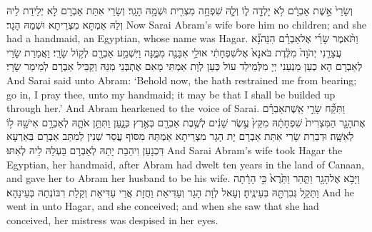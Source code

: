\newperek
\newseder
{}%
{וְשָׂרַי֙ אֵ֣שֶׁת אַבְרָ֔ם לֹ֥א יָלְדָ֖ה ל֑וֹ וְלָ֛הּ שִׁפְחָ֥ה מִצְרִ֖ית וּשְׁמָ֥הּ הָגָֽר׃}
{וְשָׂרַי אִתַּת אַבְרָם לָא יְלֵידַת לֵיהּ וְלַהּ אַמְתָּא מִצְרֵיתָא וּשְׁמַהּ הָגָר׃}
{Now Sarai Abram’s wife bore him no children; and she had a handmaid, an Egyptian, whose name was Hagar.}{}
{וַתֹּ֨אמֶר שָׂרַ֜י אֶל\maqqaf אַבְרָ֗ם הִנֵּה\maqqaf נָ֞א עֲצָרַ֤נִי יְהֹוָה֙ מִלֶּ֔דֶת בֹּא\maqqaf נָא֙ אֶל\maqqaf שִׁפְחָתִ֔י אוּלַ֥י אִבָּנֶ֖ה מִמֶּ֑נָּה וַיִּשְׁמַ֥ע אַבְרָ֖ם לְק֥וֹל שָׂרָֽי׃}
{וַאֲמַרַת שָׂרַי לְאַבְרָם הָא כְעַן מַנְעַנִי יְיָ מִלְּמֵילַד עוֹל כְּעַן לְוָת אַמְתִּי מָאִם אֶתְבְּנֵי מִנַּהּ וְקַבֵּיל אַבְרָם לְמֵימַר שָׂרָי׃}
{And Sarai said unto Abram: ‘Behold now, the \lord\space hath restrained me from bearing; go in, I pray thee, unto my handmaid; it may be that I shall be builded up through her.’ And Abram hearkened to the voice of Sarai.}{}
{וַתִּקַּ֞ח שָׂרַ֣י אֵֽשֶׁת\maqqaf אַבְרָ֗ם אֶת\maqqaf הָגָ֤ר הַמִּצְרִית֙ שִׁפְחָתָ֔הּ מִקֵּץ֙ עֶ֣שֶׂר שָׁנִ֔ים לְשֶׁ֥בֶת אַבְרָ֖ם בְּאֶ֣רֶץ כְּנָ֑עַן וַתִּתֵּ֥ן אֹתָ֛הּ לְאַבְרָ֥ם אִישָׁ֖הּ ל֥וֹ לְאִשָּֽׁה׃}
{וּדְבַרַת שָׂרַי אִתַּת אַבְרָם יָת הָגָר מִצְרֵיתָא אַמְתַּהּ מִסּוֹף עֲסַר שְׁנִין לְמִתַּב אַבְרָם בְּאַרְעָא דִּכְנָעַן וִיהַבַת יָתַהּ לְאַבְרָם בַּעְלַהּ לֵיהּ לְאִתּוּ׃}
{And Sarai Abram’s wife took Hagar the Egyptian, her handmaid, after Abram had dwelt ten years in the land of Canaan, and gave her to Abram her husband to be his wife.}{}
{וַיָּבֹ֥א אֶל\maqqaf הָגָ֖ר וַתַּ֑הַר וַתֵּ֙רֶא֙ כִּ֣י הָרָ֔תָה וַתֵּקַ֥ל גְּבִרְתָּ֖הּ בְּעֵינֶֽיהָ׃}
{וְעָאל לְוָת הָגָר וְעַדִּיאַת וַחֲזָת אֲרֵי עַדִּיאַת וְקַלַת רִבּוֹנְתַהּ בְּעֵינַהָא׃}
{And he went in unto Hagar, and she conceived; and when she saw that she had conceived, her mistress was despised in her eyes.}{}
